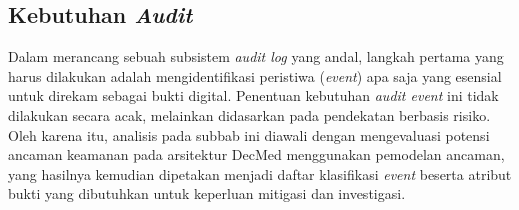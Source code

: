 \subsection{Kebutuhan \textit{Audit}}

Dalam merancang sebuah subsistem \textit{audit log} yang andal, langkah pertama yang harus dilakukan adalah mengidentifikasi peristiwa (\textit{event}) apa saja yang esensial untuk direkam sebagai bukti digital. Penentuan kebutuhan \textit{audit event} ini tidak dilakukan secara acak, melainkan didasarkan pada pendekatan berbasis risiko. Oleh karena itu, analisis pada subbab ini diawali dengan mengevaluasi potensi ancaman keamanan pada arsitektur DecMed menggunakan pemodelan ancaman, yang hasilnya kemudian dipetakan menjadi daftar klasifikasi \textit{event} beserta atribut bukti yang dibutuhkan untuk keperluan mitigasi dan investigasi.



